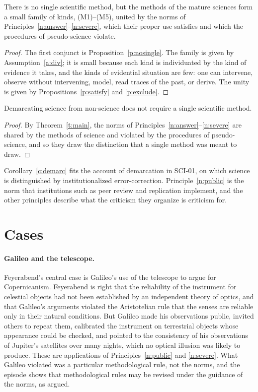 \documentclass{situationist-preprint}
\begin{document}
\begin{theorem}\label{t:main}
There is no single scientific method, but the methods of the mature sciences form a small family of kinds, (M1)--(M5), united by the norms of Principles~\ref{n:answer}--\ref{n:severe}, which their proper use satisfies and which the procedures of pseudo-science violate.
\end{theorem}

\begin{proof}
The first conjunct is Proposition~\ref{p:nosingle}. The family is given by Assumption~\ref{a:div}; it is small because each kind is individuated by the kind of evidence it takes, and the kinds of evidential situation are few: one can intervene, observe without intervening, model, read traces of the past, or derive. The unity is given by Propositions~\ref{p:satisfy} and \ref{p:exclude}.
\end{proof}

\begin{corollary}\label{c:demarc}
Demarcating science from non-science does not require a single scientific method.
\end{corollary}

\begin{proof}
By Theorem~\ref{t:main}, the norms of Principles~\ref{n:answer}--\ref{n:severe} are shared by the methods of science and violated by the procedures of pseudo-science, and so they draw the distinction that a single method was meant to draw.
\end{proof}

Corollary~\ref{c:demarc} fits the account of demarcation in SCI-01, on which science is distinguished by institutionalized error-correction. Principle~\ref{n:public} is the norm that institutions such as peer review and replication implement, and the other principles describe what the criticism they organize is criticism for.

\section{Cases}

\paragraph{Galileo and the telescope.} Feyerabend's central case is Galileo's use of the telescope to argue for Copernicanism. Feyerabend is right that the reliability of the instrument for celestial objects had not been established by an independent theory of optics, and that Galileo's arguments violated the Aristotelian rule that the senses are reliable only in their natural conditions. But Galileo made his observations public, invited others to repeat them, calibrated the instrument on terrestrial objects whose appearance could be checked, and pointed to the consistency of his observations of Jupiter's satellites over many nights, which no optical illusion was likely to produce. These are applications of Principles~\ref{n:public} and \ref{n:severe}. What Galileo violated was a particular methodological rule, not the norms, and the episode shows that methodological rules may be revised under the guidance of the norms, as \citet{Laudan1984} argued.
\end{document}

